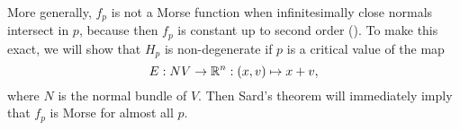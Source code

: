 More generally, $f_p$ is not a Morse function when infinitesimally close normals intersect in $p$, because then $f_p$ is constant up to second order ().
To make this exact, we will show that $H_p$ is non-degenerate if $p$ is a critical value of the map
\[
    E: NV \to  \mathbb{R}^{n}: (x, v) \mapsto x + v
,\]
where $N$ is the normal bundle of $V$.
Then Sard's theorem will immediately imply that $f_p$ is Morse for almost all $p$.

\begin{figure}[H]
    \centering
    \label{fig:existence-of-morse-functions-normal-bundle-map}
\end{figure}

